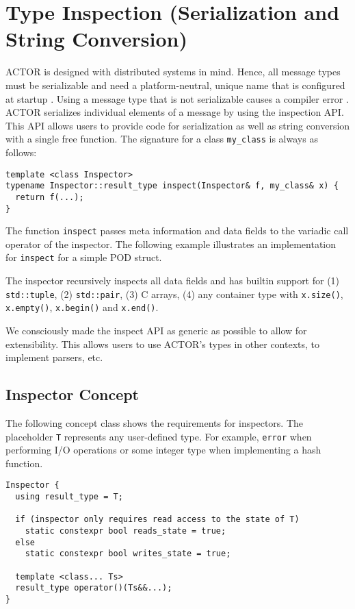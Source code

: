 \section{Type Inspection (Serialization and String Conversion)}
\label{type-inspection}

ACTOR is designed with distributed systems in mind. Hence, all message types
must be serializable and need a platform-neutral, unique name that is
configured at startup . Using a message type that
is not serializable causes a compiler error . ACTOR
serializes individual elements of a message by using the inspection API. This
API allows users to provide code for serialization as well as string conversion
with a single free function. The signature for a class \lstinline^my_class^ is
always as follows:

\begin{lstlisting}
template <class Inspector>
typename Inspector::result_type inspect(Inspector& f, my_class& x) {
  return f(...);
}
\end{lstlisting}

The function \lstinline^inspect^ passes meta information and data fields to the
variadic call operator of the inspector. The following example illustrates an
implementation for \lstinline^inspect^ for a simple POD struct.


The inspector recursively inspects all data fields and has builtin support for
(1) \lstinline^std::tuple^, (2) \lstinline^std::pair^, (3) C arrays, (4) any
container type with \lstinline^x.size()^, \lstinline^x.empty()^,
\lstinline^x.begin()^ and \lstinline^x.end()^.

We consciously made the inspect API as generic as possible to allow for
extensibility. This allows users to use ACTOR's types in other contexts, to
implement parsers, etc.

\subsection{Inspector Concept}

The following concept class shows the requirements for inspectors. The
placeholder \lstinline^T^ represents any user-defined type. For example,
\lstinline^error^ when performing I/O operations or some integer type when
implementing a hash function.

\begin{lstlisting}
Inspector {
  using result_type = T;

  if (inspector only requires read access to the state of T)
    static constexpr bool reads_state = true;
  else
    static constexpr bool writes_state = true;

  template <class... Ts>
  result_type operator()(Ts&&...);
}
\end{lstlisting}

